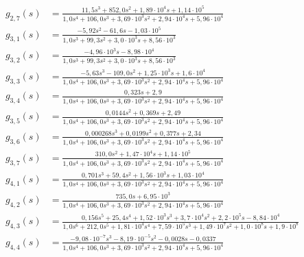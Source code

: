 \begin{landscape}
\begin{align}
    g_{2,7}(s) &= \frac{11{,}5 s^{3} + 852{,}0 s^{2} + 1{,}89 \cdot 10^{4} s + 1{,}14 \cdot 10^{5}}{1{,}0 s^{4} + 106{,}0 s^{3} + 3{,}69 \cdot 10^{3} s^{2} + 2{,}94 \cdot 10^{4} s + 5{,}96 \cdot 10^{4}} \\
    g_{3,1}(s) &= \frac{- 5{,}92 s^{2} - 61{,}6 s - 1{,}03 \cdot 10^{5}}{1{,}0 s^{3} + 99{,}3 s^{2} + 3{,}0 \cdot 10^{3} s + 8{,}56 \cdot 10^{3}} \\
    g_{3,2}(s) &= \frac{- 4{,}96 \cdot 10^{3} s - 8{,}98 \cdot 10^{4}}{1{,}0 s^{3} + 99{,}3 s^{2} + 3{,}0 \cdot 10^{3} s + 8{,}56 \cdot 10^{3}} \\
    g_{3,3}(s) &= \frac{- 5{,}63 s^{3} - 109{,}0 s^{2} + 1{,}25 \cdot 10^{3} s + 1{,}6 \cdot 10^{4}}{1{,}0 s^{4} + 106{,}0 s^{3} + 3{,}69 \cdot 10^{3} s^{2} + 2{,}94 \cdot 10^{4} s + 5{,}96 \cdot 10^{4}} \\
    g_{3,4}(s) &= \frac{0{,}323 s + 2{,}9}{1{,}0 s^{4} + 106{,}0 s^{3} + 3{,}69 \cdot 10^{3} s^{2} + 2{,}94 \cdot 10^{4} s + 5{,}96 \cdot 10^{4}} \\
    g_{3,5}(s) &= \frac{0{,}0144 s^{2} + 0{,}369 s + 2{,}49}{1{,}0 s^{4} + 106{,}0 s^{3} + 3{,}69 \cdot 10^{3} s^{2} + 2{,}94 \cdot 10^{4} s + 5{,}96 \cdot 10^{4}} \\
    g_{3,6}(s) &= \frac{0{,}000268 s^{3} + 0{,}0199 s^{2} + 0{,}377 s + 2{,}34}{1{,}0 s^{4} + 106{,}0 s^{3} + 3{,}69 \cdot 10^{3} s^{2} + 2{,}94 \cdot 10^{4} s + 5{,}96 \cdot 10^{4}} \\
    g_{3,7}(s) &= \frac{310{,}0 s^{2} + 1{,}47 \cdot 10^{4} s + 1{,}14 \cdot 10^{5}}{1{,}0 s^{4} + 106{,}0 s^{3} + 3{,}69 \cdot 10^{3} s^{2} + 2{,}94 \cdot 10^{4} s + 5{,}96 \cdot 10^{4}} \\
    g_{4,1}(s) &= \frac{0{,}701 s^{3} + 59{,}4 s^{2} + 1{,}56 \cdot 10^{3} s + 1{,}03 \cdot 10^{4}}{1{,}0 s^{4} + 106{,}0 s^{3} + 3{,}69 \cdot 10^{3} s^{2} + 2{,}94 \cdot 10^{4} s + 5{,}96 \cdot 10^{4}} \\
    g_{4,2}(s) &= \frac{735{,}0 s + 6{,}95 \cdot 10^{3}}{1{,}0 s^{4} + 106{,}0 s^{3} + 3{,}69 \cdot 10^{3} s^{2} + 2{,}94 \cdot 10^{4} s + 5{,}96 \cdot 10^{4}} \\
    g_{4,3}(s) &= \frac{0{,}156 s^{5} + 25{,}4 s^{4} + 1{,}52 \cdot 10^{3} s^{3} + 3{,}7 \cdot 10^{4} s^{2} + 2{,}2 \cdot 10^{5} s - 8{,}84 \cdot 10^{4}}{1{,}0 s^{6} + 212{,}0 s^{5} + 1{,}81 \cdot 10^{4} s^{4} + 7{,}59 \cdot 10^{5} s^{3} + 1{,}49 \cdot 10^{7} s^{2} + 1{,}0 \cdot 10^{8} s + 1{,}9 \cdot 10^{8}} \\
    g_{4,4}(s) &= \frac{- 9{,}08 \cdot 10^{-7} s^{3} - 8{,}19 \cdot 10^{-5} s^{2} - 0{,}0028 s - 0{,}0337}{1{,}0 s^{4} + 106{,}0 s^{3} + 3{,}69 \cdot 10^{3} s^{2} + 2{,}94 \cdot 10^{4} s + 5{,}96 \cdot 10^{4}} \\

\end{align}
\end{landscape}
